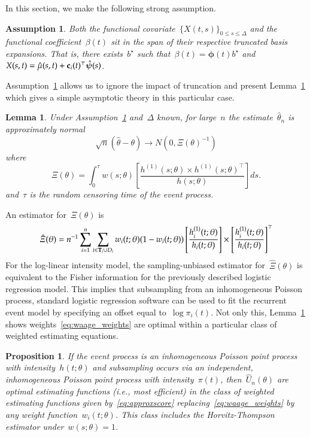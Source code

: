 \documentclass[11pt]{amsart}
\newtheorem{lemma}[thm]{Lemma}
\newtheorem{prop}[thm]{Proposition}
\newtheorem{assumption}[thm]{Assumption}
\def\bfT{{\bf T}}
\begin{document}
In this section, we make the following strong assumption.

\begin{assumption} \normalfont
\label{assumption:truncation}
Both the functional covariate~$\{ X(t,s) \}_{0\leq s \leq \Delta}$ and
the functional coefficient~$\beta(t)$ sit in the span of their
respective truncated basis expansions. That is, there
exists~$b^\star$ such that~$\beta(t) = \mathbold{\phi} (t) b^\star$
and~$X(s,t) = \hat \mu (s,t) + {\bf c}_i (t)^\top \mathbold{\hat \psi}
(s)$.
\end{assumption}

Assumption~\ref{assumption:truncation} allows us to ignore the impact
of truncation and present Lemma~\ref{lemma:simpleasym} which gives a
simple asymptotic theory in this particular case.


\begin{lemma} \normalfont
\label{lemma:simpleasym}
Under Assumption~\ref{assumption:truncation} and~$\Delta$ known, for
large~$n$ the estimate~$\hat \theta_n$ is approximately normal
\[
\sqrt{n} (\hat \theta - \theta) \to N(0, \Xi (\theta)^{-1})
\]
where
\[
  \Xi (\theta) = \int_{0}^{\tau} w(s; \theta) \left[ \frac{h^{(1)}(s;
      \theta) \times  h^{(1)} (s;\theta)^{\top}}{h(s; \theta)} \right]
  ds.
\]
and~$\tau$ is the random censoring time of the event process.
\end{lemma}
An estimator for~$\Xi(\theta)$ is
\begin{equation}
\label{eq:fisher}
  \hat \Xi (\theta) = n^{-1} \sum_{i=1}^n \sum_{t \in \bfT_i \cup D_i} 
  w_i(t;\theta) (1-w_i(t;\theta)) \left[ \frac{h_i^{(1)}(t;
      \theta)}{h_i (t; \theta)} \right] \times  \left [
    \frac{h_i^{(1)} (t;\theta)}{h_i(t; \theta)} \right]^\top
\end{equation}
For the log-linear intensity model, the sampling-unbiased estimator
for~$\hat \Xi(\theta)$ is equivalent to the Fisher information for the
previously described logistic regression model.
This implies that subsampling from an inhomogeneous Poisson process,
standard logistic regression software can be used to fit the recurrent
event model by specifying an offset equal to~$\log \pi_i (t)$.
Not only this, Lemma~\ref{prop:optimal} shows
weights~\eqref{eq:waage_weights} are optimal within a particular class
of weighted estimating equations. 

\begin{prop} \normalfont
\label{prop:optimal}
If the event process is an inhomogeneous Poisson point process with
intensity~$h(t; \theta)$ and subsampling occurs via an independent,
inhomogeneous Poisson point process with intensity~$\pi (t)$,
then~$\hat U_n (\theta)$ are optimal estimating functions (i.e., most
efficient) in the class of weighted estimating functions given
by~\eqref{eq:approxscore} replacing~\eqref{eq:waage_weights} by any
weight function~$w_i (t; \theta)$. This class includes the
Horvitz-Thompson estimator under~$w(s; \theta) = 1$.
\end{prop}
\end{document}
